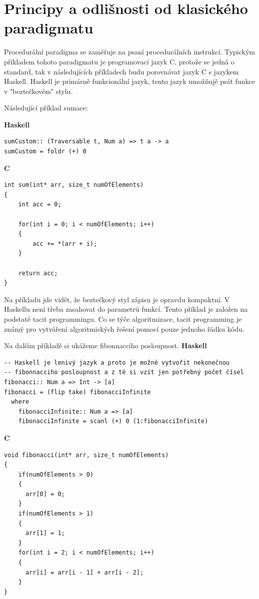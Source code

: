 \documentclass[male,czech]{kithesis}
\begin{document}
\section{Principy a odlišnosti od klasického paradigmatu}

Procedurální paradigma se zaměřuje na psaní procedurálních instrukcí.
Typickým příkladem tohoto paradigmatu je programovací jazyk C, protože se
jedná o standard, tak v následujících příkladech budu porovnávat jazyk C s jazykem Haskell.
Haskell je primárně funkcionální jazyk, tento jazyk umožňujě psát funkce
v "beztečkovém" stylu. 

Následující příklad sumace:

\textbf{Haskell}
\begin{verbatim}
sumCustom:: (Traversable t, Num a) => t a -> a
sumCustom = foldr (+) 0
\end{verbatim}
\pagebreak
\textbf{C}
\begin{verbatim}
int sum(int* arr, size_t numOfElements)
{
    int acc = 0;
    
    for(int i = 0; i < numOfElements; i++)
    {
        acc += *(arr + i);
    }
    
    return acc;
}
\end{verbatim}
Na příkladu jde vidět, že beztečkový styl zápisu je opravdu kompaktní. 
V Haskellu není třeba zasahovat do parametrů funkcí.
Tento příklad je založen na podstatě tacit programmingu.
Co se týče algoritmizace, tacit programming je známý pro vytváření 
algoritmických řešení pomocí pouze jednoho řádku kódu. 

Na dalším příkladě si ukážeme fibonnacciho posloupnost.
\textbf{Haskell}
\begin{verbatim}
-- Haskell je lenivý jazyk a proto je možné vytvořit nekonečnou 
-- fibonnacciho posloupnost a z té si vzít jen potřebný počet čísel 
fibonacci:: Num a => Int -> [a]
fibonacci = (flip take) fibonacciInfinite
  where
    fibonacciInfinite:: Num a => [a]
    fibonacciInfinite = scanl (+) 0 (1:fibonacciInfinite)
\end{verbatim}

\vfill
\pagebreak

\textbf{C}
\begin{verbatim}
void fibonacci(int* arr, size_t numOfElements)
{
    if(numOfElements > 0)
    {
      arr[0] = 0;
    }
    if(numOfElements > 1)
    {
      arr[1] = 1;
    }
    for(int i = 2; i < numOfElements; i++)
    {
      arr[i] = arr[i - 1] + arr[i - 2];
    }
}
\end{verbatim}
\end{document}
